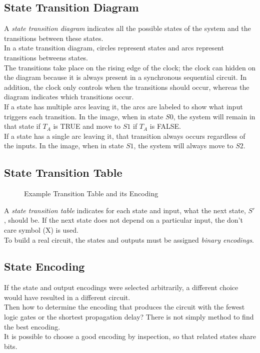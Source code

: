 \documentclass[12pt]{article}
\theoremstyle{definition}
\newcommand{\includePicture}[3]{
  \begin{figure}[!ht]
  \centering
  \scalebox{#1}{\texttt{[image: \#2]}}
  \caption{#3}
  \end{figure}
}
\begin{document}
  \subsection{State Transition Diagram}
  A \emph{state transition diagram} indicates all the possible states of the system and the transitions between these states. \\
  In a state transition diagram, circles represent states and arcs represent transitions betweens states. \\
  The transitions take place on the rising edge of the clock; the clock can hidden on the diagram because it is always present in a synchronous sequential circuit.
  In addition, the clock only controls when the transitions should occur, whereas the diagram indicates which transitions occur. \\
  If a state has multiple arcs leaving it, the arcs are labeled to show what input triggers each transition.
  In the image, when in state $S0$, the system will remain in that state if $T_{A}$ is TRUE and move to $S1$ if $T_{A}$ is FALSE. \\
  If a state has a single arc leaving it, that transition always occurs regardless of the inputs.
  In the image, when in state $S1$, the system will always move to $S2$.

  \subsection{State Transition Table}
  \includePicture{0.8}{pictures/stateTTableStateEncode.png}{Example Transition Table and its Encoding}
  A \emph{state transition table} indicates for each state and input, what the next state, $S'$, should be.
  If the next state does not depend on a particular input, the don't care symbol (X) is used. \\
  To build a real circuit, the states and outputs must be assigned \emph{binary encodings}.

  \subsection{State Encoding}
  If the state and output encodings were selected arbitrarily, a different choice would have resulted in a different circuit. \\
  Then how to determine the encoding that produces the circuit with the fewest logic gates or the shortest propagation delay?
  There is not simply method to find the best encoding. \\
  It is possible to choose a good encoding by inspection, so that related states share bits. \\
\end{document}
